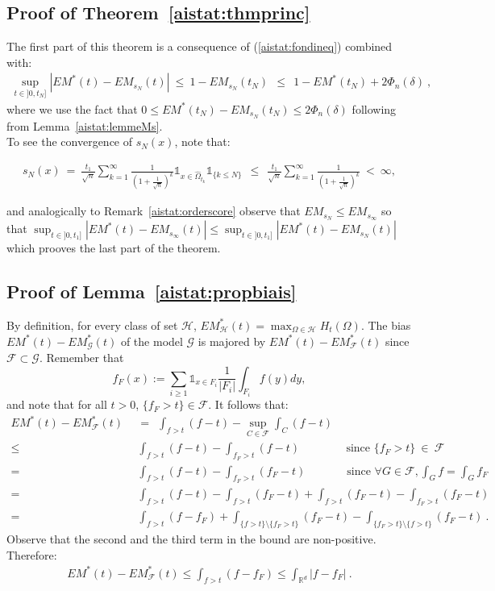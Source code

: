 \subsection*{Proof of Theorem~\ref{aistat:thmprinc}}
\noindent
The first part of this theorem is a consequence of (\ref{aistat:fondineq}) combined with:
\begin{align*}
\sup_{t \in ]0,t_N]} |EM^*(t)-EM_{s_N}(t)| ~\le~ 1-EM_{s_N}(t_N) ~~\le~~ 1-EM^*(t_N)+2\Phi_n(\delta)~,
\end{align*} 
where we use the fact that $0 \le EM^*(t_N)-EM_{s_N}(t_N) \le 2 \Phi_n(\delta)$ following from Lemma~\ref{aistat:lemmeMs}.\\
\noindent To see the convergence of $s_N(x)$, note that:

\begin{align*}
s_N(x)~=~\frac{t_1}{\sqrt n} \sum_{k=1}^{\infty}\frac{1}{(1+\frac{1}{\sqrt n})^k} \mathds{1}_{x \in \hat \Omega_{t_k}} \mathds{1}_{\{k \le N\}}~~\le~~ \frac{t_1}{\sqrt n} \sum_{k=1}^{\infty} \frac{1}{(1+\frac{1}{\sqrt n})^k} ~<~ \infty,
\end{align*}

and analogically to Remark~\ref{aistat:orderscore} observe that $EM_{s_N} \le EM_{s_\infty}$ so that $\sup_{t \in ]0,t_1]} |EM^*(t)-EM_{s_\infty}(t)| \leq \sup_{t \in ]0,t_1]} |EM^*(t)-EM_{s_N}(t)|$ which prooves the last part of the theorem.

\subsection*{Proof of Lemma~\ref{aistat:propbiais}}

By definition, for every class of set $\mathcal{H}$, $EM_{\mathcal{H}}^*(t)=\max_{\Omega \in \mathcal{H}}H_t(\Omega)$.
The bias $ EM^*(t)-EM^*_{\mathcal{G}}(t)$ of the model $\mathcal{G}$ is majored by $ EM^*(t)-EM^*_{\mathcal{F}}(t)$ since $\mathcal{F} \subset \mathcal{G}$.
\noindent Remember that $$f_{F}(x) := \sum_{i \ge 1} \mathds{1}_{x \in F_i} \frac{1}{|F_i|} \int_{F_i}f(y)dy,$$ and note that for all $t>0$, $\{ f_{F} > t \} \in \mathcal{F}$. It follows that:
\begin{align*}
EM^*(t)-EM^*_{\mathcal{F}}(t) &~~=~~ \int_{f>t}(f-t)- \sup_{C \in \mathcal{F} }\int_{C}(f-t) \\
\le&~~ \int_{f>t}(f-t)- \int_{f_{F} > t}(f-t) ~~~~~~~~~~~~~~~~~\mbox{~since~} \{f_{F} > t\} ~\in~ \mathcal{F}  \\
=&~~\int_{f>t}(f-t)- \int_{f_{F} > t}(f_{F}-t) ~~~~~~~~~~~~~~~\mbox{~since~} \forall G \in \mathcal{F}, \int_Gf=\int_Gf_{F}\\
=&~~\int_{f>t}(f-t)-\int_{f>t}(f_{F}-t)+\int_{f>t}(f_{F}-t)-\int_{f_{F} > t}(f_{F}-t)\\
=&~~\int_{f>t}(f-f_{F})+\int_{\{f>t\}\setminus \{f_{F}>t\}}(f_{F}-t)-\int_{\{f_{F}>t\} \setminus \{f>t\}}(f_{F}-t)~.
\end{align*}
\noindent Observe that the second and the third term in the bound are non-positive. Therefore:
\begin{align*}
EM^*(t)-EM^*_{\mathcal{F}}(t) \le \int_{f>t}(f-f_{F}) \le \int_{\mathbb{R}^d}|f-f_{F}|~.
\end{align*}
